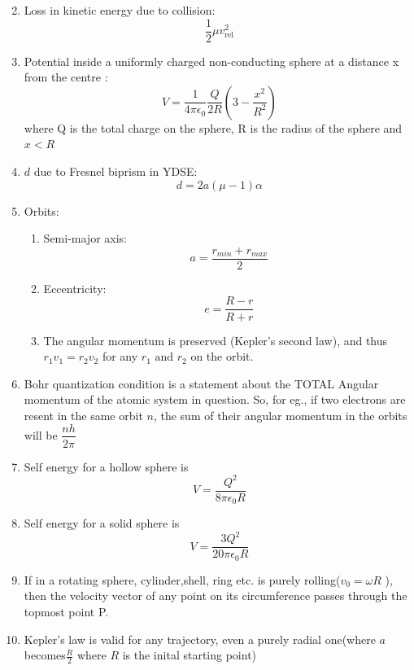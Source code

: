 \documentclass{article}
\numberwithin{equation}{section}
\numberwithin{figure}{section}
\begin{document}
\begin{enumerate}
\begin{equation}
		\end{equation}
	\item Loss in kinetic energy due to collision:
		\begin{equation}
			\frac{1}{2}\mu v_{\text{rel}}^2
		\end{equation}
	\item Potential inside a uniformly charged non-conducting sphere at a distance x from the centre :
		\begin{equation}
			V=\frac{1}{4\pi \epsilon_0} \frac{Q}{2R}(3-\frac{x^2}{R^2})
		\end{equation}
		where Q is the total charge on the sphere, R is the radius of the sphere and $x<R$ 
	\item $d$ due to Fresnel biprism in YDSE:
		\begin{equation}
			d=2a(\mu-1)\alpha
		\end{equation}
	\item Orbits:
		\begin{enumerate}
			\item Semi-major axis:
				\begin{equation}
					a=\frac{r_{min}+r_{max}}{2}
				\end{equation}
			\item Eccentricity:
				\begin{equation}
					e=\frac{R-r}{R+r}
				\end{equation}
			\item The angular momentum is preserved (Kepler's second law), and thus $r_1 v_1= r_2 v_2$ for any $r_1 \text{ and } r_2$ on the orbit.
		\end{enumerate}
	\item Bohr quantization condition is a statement about the TOTAL Angular momentum of the atomic system in question. So, for eg., if two electrons are resent in the same orbit $n$, the sum of their angular momentum in the orbits will be $\dfrac{nh}{2\pi}$
	\item Self energy for a hollow sphere is $$V=\frac{Q^2}{8\pi\epsilon_0 R}$$
	\item Self energy for a solid sphere is $$V=\frac{3 Q^2}{20\pi\epsilon_0 R}$$
	\item If in a rotating sphere, cylinder,shell, ring etc. is purely rolling($v_0= \omega R$ ), then the velocity vector of any point on its circumference passes through the topmost point P.
	\item Kepler's law is valid for any trajectory, even a purely radial one(where $a$ becomes$\frac{R}{2}$ where $R$ is the inital starting point)
\end{enumerate}
\end{document}
